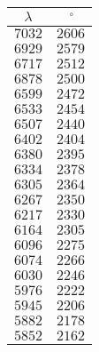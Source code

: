 \begin{tabular}{| c | c |}
\hline
$\lambda$ & $\, ^{\circ}$\\
\hline
$7032$ & $2606$\\
\hline
$6929$ & $2579$\\
\hline
$6717$ & $2512$\\
\hline
$6878$ & $2500$\\
\hline
$6599$ & $2472$\\
\hline
$6533$ & $2454$\\
\hline
$6507$ & $2440$\\
\hline
$6402$ & $2404$\\
\hline
$6380$ & $2395$\\
\hline
$6334$ & $2378$\\
\hline
$6305$ & $2364$\\
\hline
$6267$ & $2350$\\
\hline
$6217$ & $2330$\\
\hline
$6164$ & $2305$\\
\hline
$6096$ & $2275$\\
\hline
$6074$ & $2266$\\
\hline
$6030$ & $2246$\\
\hline
$5976$ & $2222$\\
\hline
$5945$ & $2206$\\
\hline
$5882$ & $2178$\\
\hline
$5852$ & $2162$\\
\hline
\end{tabular}
